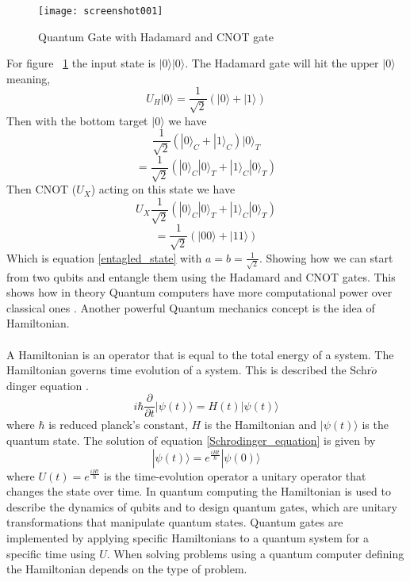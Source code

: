 \documentclass{Assignment}
\begin{document}
\begin{figure}[H]
	\centering
	\texttt{[image: screenshot001]}
	\caption{Quantum Gate with Hadamard and CNOT gate}
	\label{entanglement}
\end{figure}
For figure ~\ref{entanglement} the input state is $|0\rangle|0\rangle$.
The Hadamard gate will hit the upper $|0\rangle$ meaning,
$$U_H|0\rangle = \frac{1}{\sqrt{2}}(|0 \rangle + |1\rangle)$$
Then with the bottom target $|0\rangle$ we have
 $$\frac{1}{\sqrt{2}}(|0 \rangle_C + |1\rangle_C)|0\rangle_T$$
$$=\frac{1}{\sqrt{2}}(|0 \rangle_C|0 \rangle_T + |1\rangle_C|0 \rangle_T)$$
Then CNOT ($U_X$) acting on this state we have 
$$U_X\frac{1}{\sqrt{2}}(|0 \rangle_C|0 \rangle_T + |1\rangle_C|0 \rangle_T) $$
$$ =\frac{1}{\sqrt{2}}\left(|00\rangle + |11\rangle\right)$$
Which is equation \ref{entagled_state} with $a=b = \frac{1}{\sqrt{2}}$.
Showing how we can start from two qubits and entangle them using the Hadamard and CNOT gates.
This shows how in theory Quantum computers have more computational power over classical ones \cite{Deutsch1989}.
Another powerful Quantum mechanics concept is the idea of Hamiltonian.
\\\\
A Hamiltonian is an operator that is equal to the total energy of a system.\cite{mcintyre_quantum_2012}
The Hamiltonian governs time evolution of a system.
This is described the Schr$\ddot{o}$dinger equation \cite{mcintyre_quantum_2012}.
\begin{equation}
i \hbar\frac{\partial}{\partial t}|\psi(t)\rangle = H(t)|\psi(t)\rangle
\label{Schrodinger_equation}
\end{equation}
where $\hbar$ is reduced planck's constant, $H$ is the Hamiltonian and $|\psi(t)\rangle$ is the quantum state.
The solution of equation \ref{Schrodinger_equation} is given by 
\begin{equation}
|\psi(t)\rangle = e^{\frac{i H t}{\hbar}}|\psi(0)\rangle
\end{equation}
where $U(t)=e^{\frac{i H t}{\hbar}} $ is the time-evolution operator a unitary operator that changes the state over time.\cite{UQS}
In quantum computing the Hamiltonian is used to describe the dynamics of qubits and to design quantum gates, which are unitary transformations that manipulate quantum states. \cite{Deutsch1989} 
Quantum gates are implemented by applying specific Hamiltonians to a quantum system for a specific time using $U$.
When solving problems using a quantum computer defining the Hamiltonian depends on the type of problem.
\end{document}
